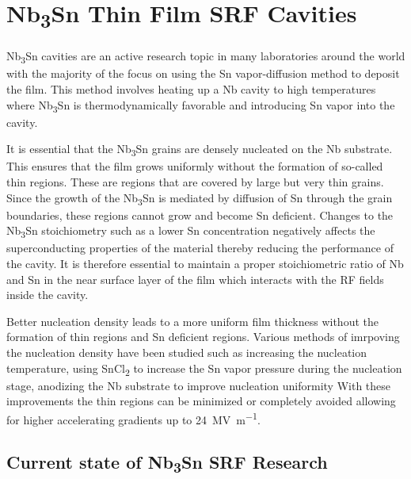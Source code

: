 \section{Nb\textsubscript{3}Sn Thin Film SRF Cavities}
\label{sec:nb3snbackground}

Nb\textsubscript{3}Sn cavities are an active research topic in many laboratories around the world\cite{porter2019progress,posen2017nb3sn,pudasaini2019initial,pudasaini2019growth} with the majority of the focus on using the Sn vapor-diffusion method to deposit the film. This method involves heating up a Nb cavity to high temperatures where Nb\textsubscript{3}Sn is thermodynamically favorable and introducing Sn vapor into the cavity. 

It is essential that the Nb\textsubscript{3}Sn grains are densely nucleated on the Nb substrate. This ensures that the film grows uniformly without the formation of so-called thin regions. These are regions that are covered by large but very thin grains. Since the growth of the Nb\textsubscript{3}Sn is mediated by diffusion of Sn through the grain boundaries, these regions cannot grow and become Sn deficient\cite{pudasaini2019growth,trenikhina2018performance}. Changes to the Nb\textsubscript{3}Sn stoichiometry such as a lower Sn concentration negatively affects the superconducting properties of the material\cite{Godeke_2006} thereby reducing the performance of the cavity\cite{trenikhina2018performance}. It is therefore essential to maintain a proper stoichiometric ratio of Nb and Sn in the near surface layer of the film which interacts with the RF fields inside the cavity.

Better nucleation density leads to a more uniform film thickness without the formation of thin regions and Sn deficient regions\cite{posen2021advances}. Various methods of imrpoving the nucleation density have been studied such as increasing the nucleation temperature, using SnCl\textsubscript{2} to increase the Sn vapor pressure during the nucleation stage, anodizing the Nb substrate to improve nucleation uniformity\cite{pudasaini2017experimental,pudasaini2017surface,posen2021advances} With these improvements the thin regions can be minimized or completely avoided allowing for higher accelerating gradients up to \qty{24}{\mega\volt\per\meter}\cite{posen2021advances}.


\subsection{Current state of Nb\textsubscript{3}Sn SRF Research}

